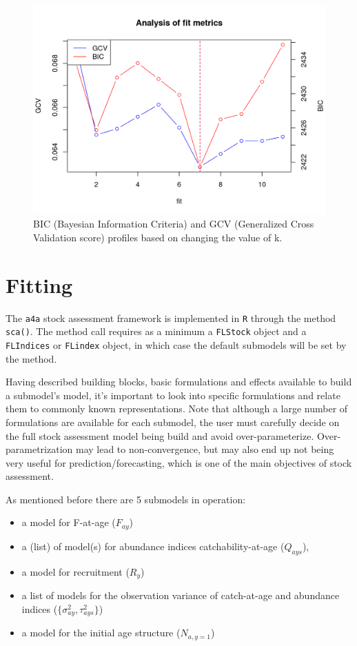 \documentclass[
]{book}
\providecommand{\tightlist}{%
  \setlength{\itemsep}{0pt}\setlength{\parskip}{0pt}}
\begin{document}
\begin{figure}
\centering
\includegraphics{_bookdown_files/_main_files/figure-html/bic-1.png}
\caption{\label{fig:bic}BIC (Bayesian Information Criteria) and GCV (Generalized Cross Validation score) profiles based on changing the value of k.}
\end{figure}

\hypertarget{fitting}{%
\chapter{Fitting}\label{fitting}}

The \texttt{a4a} stock assessment framework is implemented in \texttt{R} through the method \texttt{sca()}. The method call requires as a minimum a \texttt{FLStock} object and a \texttt{FLIndices} or \texttt{FLindex} object, in which case the default submodels will be set by the method.

Having described building blocks, basic formulations and effects available to build a submodel's model, it's important to look into specific formulations and relate them to commonly known representations. Note that although a large number of formulations are available for each submodel, the user must carefully decide on the full stock assessment model being build and avoid over-parameterize. Over-parametrization may lead to non-convergence, but may also end up not being very useful for prediction/forecasting, which is one of the main objectives of stock assessment.

As mentioned before there are 5 submodels in operation:

\begin{itemize}
\tightlist
\item
  a model for F-at-age (\(F_{ay}\))
\item
  a (list) of model(s) for abundance indices catchability-at-age (\(Q_{ays}\)),
\item
  a model for recruitment (\(R_y\))
\item
  a list of models for the observation variance of catch-at-age and abundance indices (\(\{\sigma^2_{ay}, \tau^2_{ays}\}\))
\item
  a model for the initial age structure (\(N_{a,y=1}\))
\end{itemize}
\end{document}
